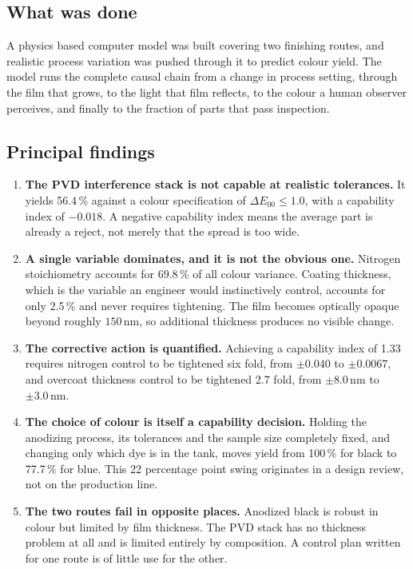\documentclass[11pt,a4paper]{article}
\newcommand{\dE}{\ensuremath{\Delta E_{00}}}
\newcommand{\nm}{\ensuremath{\,\mathrm{nm}}}
\begin{document}
\subsection*{What was done}

A physics based computer model was built covering two finishing routes, and
realistic process variation was pushed through it to predict colour yield. The
model runs the complete causal chain from a change in process setting, through
the film that grows, to the light that film reflects, to the colour a human
observer perceives, and finally to the fraction of parts that pass inspection.

\subsection*{Principal findings}

\begin{enumerate}[leftmargin=1.6em, itemsep=6pt]

\item \textbf{The PVD interference stack is not capable at realistic
tolerances.} It yields 56.4\,\% against a colour specification of $\dE \le 1.0$,
with a capability index of $-0.018$. A negative capability index means the
average part is already a reject, not merely that the spread is too wide.

\item \textbf{A single variable dominates, and it is not the obvious one.}
Nitrogen stoichiometry accounts for 69.8\,\% of all colour variance. Coating
thickness, which is the variable an engineer would instinctively control,
accounts for only 2.5\,\% and never requires tightening. The film becomes
optically opaque beyond roughly $150\nm$, so additional thickness produces no
visible change.

\item \textbf{The corrective action is quantified.} Achieving a capability
index of 1.33 requires nitrogen control to be tightened six fold, from
$\pm 0.040$ to $\pm 0.0067$, and overcoat thickness control to be tightened 2.7
fold, from $\pm 8.0\nm$ to $\pm 3.0\nm$.

\item \textbf{The choice of colour is itself a capability decision.} Holding
the anodizing process, its tolerances and the sample size completely fixed, and
changing only which dye is in the tank, moves yield from 100\,\% for black to
77.7\,\% for blue. This 22 percentage point swing originates in a design
review, not on the production line.

\item \textbf{The two routes fail in opposite places.} Anodized black is
robust in colour but limited by film thickness. The PVD stack has no thickness
problem at all and is limited entirely by composition. A control plan written
for one route is of little use for the other.

\end{enumerate}
\end{document}
